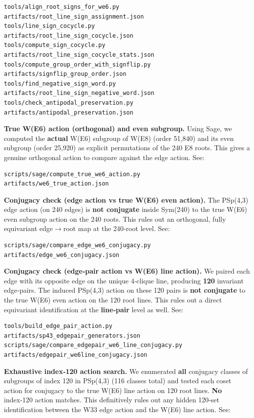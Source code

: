\documentclass[11pt]{article}
\begin{document}
\begin{verbatim}
tools/align_root_signs_for_we6.py
artifacts/root_line_sign_assignment.json
tools/line_sign_cocycle.py
artifacts/root_line_sign_cocycle.json
tools/compute_sign_cocycle.py
artifacts/root_line_sign_cocycle_stats.json
tools/compute_group_order_with_signflip.py
artifacts/signflip_group_order.json
tools/find_negative_sign_word.py
artifacts/root_line_sign_negative_word.json
tools/check_antipodal_preservation.py
artifacts/antipodal_preservation.json
\end{verbatim}

\textbf{True W(E6) action (orthogonal) and even subgroup.} Using Sage,
we computed the \textbf{actual} W(E6) subgroup of W(E8) (order 51,840)
and its even subgroup (order 25,920) as explicit permutations of the 240
E8 roots. This gives a genuine orthogonal action to compare against the
edge action. See:

\begin{verbatim}
scripts/sage/compute_true_we6_action.py
artifacts/we6_true_action.json
\end{verbatim}

\textbf{Conjugacy check (edge action vs true W(E6) even action).} The
PSp(4,3) edge action (on 240 edges) is \textbf{not conjugate} inside
Sym(240) to the true W(E6) even subgroup action on the 240 roots. This
rules out an orthogonal, fully equivariant
edge\ensuremath{\rightarrow}root map at the 240‑root level. See:

\begin{verbatim}
scripts/sage/compare_edge_we6_conjugacy.py
artifacts/edge_we6_conjugacy.json
\end{verbatim}

\textbf{Conjugacy check (edge‑pair action vs W(E6) line action).} We
paired each edge with its opposite edge on the unique 4‑clique line,
producing \textbf{120} invariant edge‑pairs. The induced PSp(4,3) action
on these 120 pairs is \textbf{not conjugate} to the true W(E6) even
action on the 120 root lines. This rules out a direct equivariant
identification at the \textbf{line‑pair} level as well. See:

\begin{verbatim}
tools/build_edge_pair_action.py
artifacts/sp43_edgepair_generators.json
scripts/sage/compare_edgepair_we6_line_conjugacy.py
artifacts/edgepair_we6line_conjugacy.json
\end{verbatim}

\textbf{Exhaustive index‑120 action search.} We enumerated \textbf{all}
conjugacy classes of subgroups of index 120 in PSp(4,3) (116 classes
total) and tested each coset action for conjugacy to the true W(E6) line
action on 120 root lines. \textbf{No} index‑120 action matches. This
definitively rules out any hidden 120‑set identification between the W33
edge action and the W(E6) line action. See:
\end{document}
